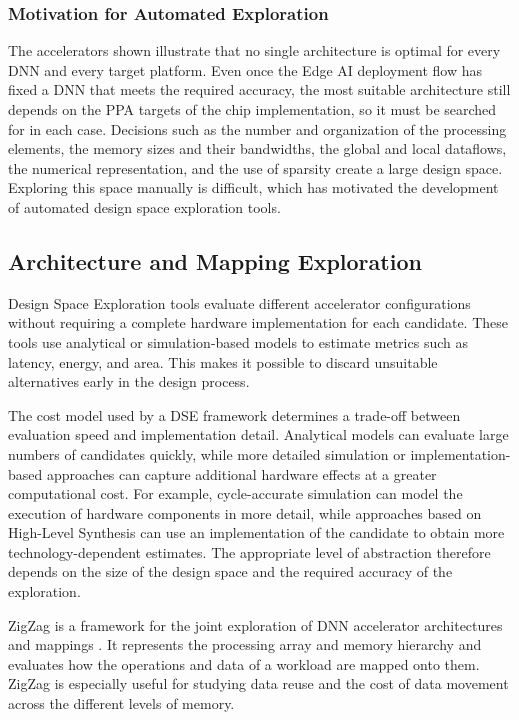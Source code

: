 \subsubsection{Motivation for Automated Exploration}

The accelerators shown illustrate that no single architecture is
optimal for every DNN and every target platform. Even once the Edge AI
deployment flow has fixed a DNN that meets the required accuracy, the
most suitable architecture still depends on the PPA targets of the
chip implementation, so it must be searched for in each case.
Decisions such as the
number and organization of the processing elements, the memory sizes
and their bandwidths, the global and local dataflows, the numerical representation, and the use of
sparsity create a large design space. Exploring this space manually is
difficult, which has motivated the development of automated design
space exploration tools.

\subsection{Architecture and Mapping Exploration}

Design Space Exploration tools evaluate different accelerator
configurations without requiring a complete hardware implementation
for each candidate. These tools use analytical or simulation-based
models to estimate metrics such as latency, energy, and area. This
makes it possible to discard unsuitable alternatives early in the
design process.

The cost model used by a DSE framework determines a trade-off between
evaluation speed and implementation detail. Analytical models can
evaluate large numbers of candidates quickly, while more detailed
simulation or implementation-based approaches can capture additional
hardware effects at a greater computational cost. For example,
cycle-accurate simulation can model the execution of hardware
components in more detail, while approaches based on High-Level
Synthesis can use an implementation of the candidate to obtain more
technology-dependent estimates. The appropriate level of abstraction
therefore depends on the size of the design space and the required
accuracy of the exploration.

ZigZag is a framework for the joint exploration of DNN accelerator
architectures and mappings \cite{zigzag}. It represents the processing
array and memory hierarchy and evaluates how the operations and data
of a workload are mapped onto them. ZigZag is especially useful for
studying data reuse and the cost of data movement across the different
levels of memory.

